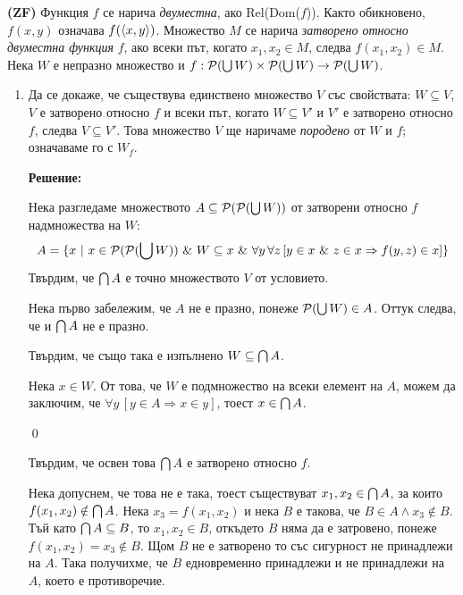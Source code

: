 
\begin{problem}
\textbf{(ZF)}
Функция $f$ се нарича \textit{двуместна}, ако Rel(Dom($f$)). Както обикновено,
$f(x, y)$ означава $f (\langle x, y \rangle)$. Множество $M$ се нарича
\textit{затворено относно двуместна функция} $f$,
ако всеки път, когато $x_1, x_2 \in M$, следва $f(x_1, x_2) \in M$.
Нека $W$ е непразно множество и $f: \mathcal{P}(\bigcup W) \times \mathcal{P}(\bigcup W) \to \mathcal{P}(\bigcup W)$.
\begin{enumerate}
\item Да се докаже, че съществува единствено множество $V$ със свойствата:
$W \subseteq V$, $V$ е затворено относно $f$ и всеки път, когато $W \subseteq V'$
и $V'$ е затворено относно $f$, следва $V \subseteq V'$. Това множество $V$ ще
наричаме \textit{породено} от $W$ и $f$; означаваме го с $W_f$.

\textbf{Решение:}

\smallbreak
\quad
Нека разгледаме множеството $A \subseteq \mathcal{P}(\mathcal{P}(\bigcup W))$ от затворени относно $f$ надмножества на $W$:
\[
	A = \{x\ |\ x \in \mathcal{P}(\mathcal{P}(\bigcup W)) \ \&\  W \subseteq x \ \&\  \forall y\, \forall z\, [ y \in x \ \&\  z \in x \Rightarrow f(y, z) \in x ] \}
\]
\quad
Твърдим, че $\bigcap A$ е точно множеството $V$ от условието.

\begin{tcolorbox}[mybox={Доказателство:}]
\quad
Нека първо забележим, че $A$ не е празно, понеже $\mathcal{P}(\bigcup W) \in A$. Оттук следва, че и $\bigcap A$ не е празно.

\quad
Твърдим, че също така е изпълнено $W \subseteq \bigcap A$.
\begin{tcolorbox}[mybox={Доказателство:}, colback=green!20, colframe=green!60]
\quad
Нека $x \in W$.
От това, че $W$ е подмножество на всеки елемент на $A$, можем да заключим, че $\forall y\, [y \in A \Rightarrow x \in y]$, тоест $x \in \bigcap A$.

\qed
\end{tcolorbox}

\quad
Твърдим, че освен това $\bigcap A$ е затворено относно $f$.

\begin{tcolorbox}[mybox={Доказателство:}, colback=green!20, colframe=green!60]
\quad
Нека допуснем, че това не е така, тоест съществуват $x_1, x_2 \in \bigcap A$,
за които $f(x_1, x_2) \notin \bigcap A$.
Нека $x_3 = f(x_1, x_2)$ и нека $B$ е такова, че $B \in A \land x_3 \notin B$.
Тъй като $\bigcap A \subseteq B$, то $x_1, x_2 \in B$, откъдето $B$ няма да е затровено, понеже
$f(x_1, x_2) = x_3 \notin B$. Щом $B$ не е затворено то със сигурност не принадлежи на $A$.
Така получихме, че $B$ едновременно принадлежи и не принадлежи на $A$, което е противоречие.


\end{tcolorbox}
\end{tcolorbox}
\end{enumerate}
\end{problem}
